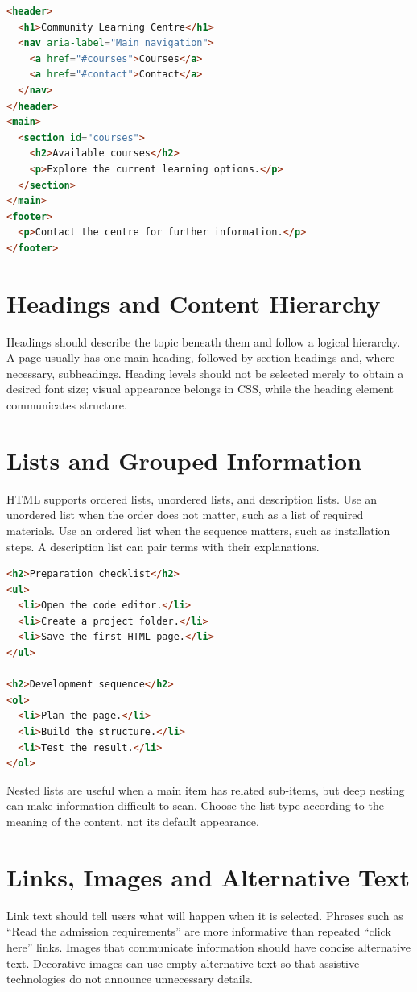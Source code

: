 \documentclass[11pt,openany,oneside]{book}
\begin{document}
\begin{lstlisting}[style=webcode,language=HTML]
<header>
  <h1>Community Learning Centre</h1>
  <nav aria-label="Main navigation">
    <a href="#courses">Courses</a>
    <a href="#contact">Contact</a>
  </nav>
</header>
<main>
  <section id="courses">
    <h2>Available courses</h2>
    <p>Explore the current learning options.</p>
  </section>
</main>
<footer>
  <p>Contact the centre for further information.</p>
</footer>
\end{lstlisting}

\section{Headings and Content Hierarchy}
Headings should describe the topic beneath them and follow a logical hierarchy. A page usually has one main heading, followed by section headings and, where necessary, subheadings. Heading levels should not be selected merely to obtain a desired font size; visual appearance belongs in CSS, while the heading element communicates structure.


\section{Lists and Grouped Information}
HTML supports ordered lists, unordered lists, and description lists. Use an unordered list when the order does not matter, such as a list of required materials. Use an ordered list when the sequence matters, such as installation steps. A description list can pair terms with their explanations.

\begin{lstlisting}[style=webcode,language=HTML]
<h2>Preparation checklist</h2>
<ul>
  <li>Open the code editor.</li>
  <li>Create a project folder.</li>
  <li>Save the first HTML page.</li>
</ul>

<h2>Development sequence</h2>
<ol>
  <li>Plan the page.</li>
  <li>Build the structure.</li>
  <li>Test the result.</li>
</ol>
\end{lstlisting}
Nested lists are useful when a main item has related sub-items, but deep nesting can make information difficult to scan. Choose the list type according to the meaning of the content, not its default appearance.

\section{Links, Images and Alternative Text}
Link text should tell users what will happen when it is selected. Phrases such as “Read the admission requirements” are more informative than repeated “click here” links. Images that communicate information should have concise alternative text. Decorative images can use empty alternative text so that assistive technologies do not announce unnecessary details.
\end{document}
